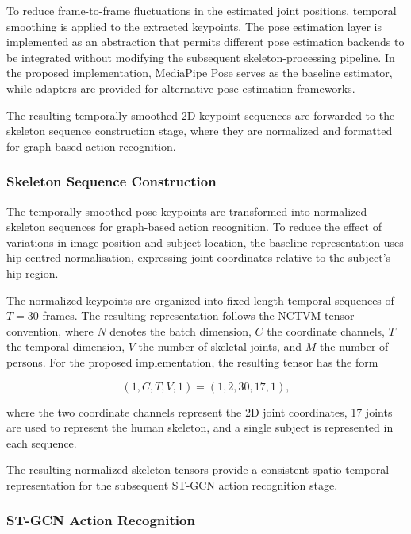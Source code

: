 \documentclass[conference]{IEEEtran}
\begin{document}
To reduce frame-to-frame fluctuations in the estimated joint positions,
temporal smoothing is applied to the extracted keypoints. The pose
estimation layer is implemented as an abstraction that permits different
pose estimation backends to be integrated without modifying the
subsequent skeleton-processing pipeline. In the proposed implementation,
MediaPipe Pose serves as the baseline estimator, while adapters are
provided for alternative pose estimation frameworks.

The resulting temporally smoothed 2D keypoint sequences are forwarded to
the skeleton sequence construction stage, where they are normalized and
formatted for graph-based action recognition.

\subsubsection{Skeleton Sequence Construction}

The temporally smoothed pose keypoints are transformed into normalized
skeleton sequences for graph-based action recognition. To reduce the
effect of variations in image position and subject location, the
baseline representation uses hip-centred normalisation, expressing
joint coordinates relative to the subject's hip region.

The normalized keypoints are organized into fixed-length temporal
sequences of $T=30$ frames. The resulting representation follows the
NCTVM tensor convention, where $N$ denotes the batch dimension, $C$ the
coordinate channels, $T$ the temporal dimension, $V$ the number of
skeletal joints, and $M$ the number of persons. For the proposed
implementation, the resulting tensor has the form

\begin{equation}
(1,C,T,V,1)=(1,2,30,17,1),
\end{equation}

where the two coordinate channels represent the 2D joint coordinates,
17 joints are used to represent the human skeleton, and a single
subject is represented in each sequence.

The resulting normalized skeleton tensors provide a consistent
spatio-temporal representation for the subsequent ST-GCN action
recognition stage.

\subsubsection{ST-GCN Action Recognition}
\end{document}
